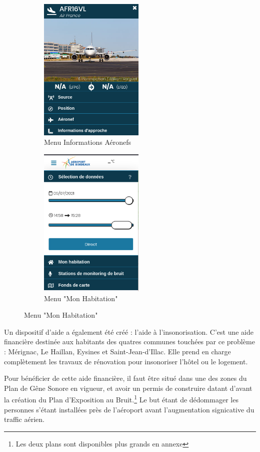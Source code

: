 \begin{figure}[hbt!]
  \begin{subfigure}{0.5\textwidth}
    \centering
    \includegraphics[width=5cm]{Images/aerovisioninfo.png}  
    \caption{Menu Informations Aéronefs}
    \label{fig:aerovisioninfo}
  \end{subfigure}
  \begin{subfigure}{0.5\textwidth}
    \centering
    \includegraphics[width=5cm]{Images/aerovisionmaison.png}  
    \caption{Menu "Mon Habitation"}
    \label{fig:aerovisionmaison}
  \end{subfigure}
\end{figure}

Un dispositif d'aide a également été créé : l'aide à l'insonorisation.
C'est une aide financière destinée aux habitants des quatres communes touchées par ce problème : Mérignac, Le Haillan, Eysines et Saint-Jean-d'Illac. Elle prend en charge complètement les travaux de rénovation pour insonoriser l'hôtel ou le logement.

Pour bénéficier de cette aide financière, il faut être situé dans une des zones du Plan de Gêne Sonore en vigueur, et avoir un permis de construire datant d'avant la création du Plan d'Exposition au Bruit.\footnote{Les deux plans sont disponibles plus grands en annexe}
Le but étant de dédommager les personnes s'étant installées près de l'aéroport avant l'augmentation signicative du traffic aérien.

